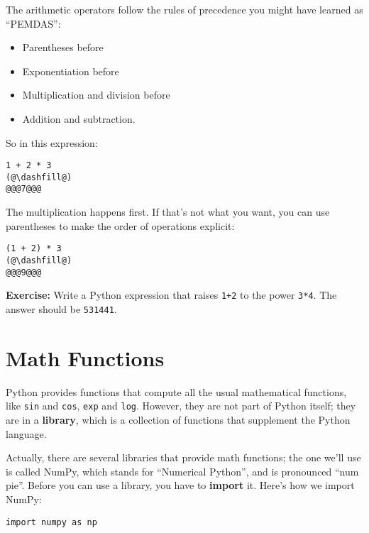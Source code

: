 The arithmetic operators follow the rules of precedence you might have
learned as ``PEMDAS'':

\begin{itemize}

\item
  Parentheses before
\item
  Exponentiation before
\item
  Multiplication and division before
\item
  Addition and subtraction.
\end{itemize}

So in this expression:

\begin{lstlisting}[]
1 + 2 * 3
(@\dashfill@)
@@@7@@@
\end{lstlisting}

The multiplication happens first. If that's not what you want, you can
use parentheses to make the order of operations explicit:

\begin{lstlisting}[]
(1 + 2) * 3
(@\dashfill@)
@@@9@@@
\end{lstlisting}

\textbf{Exercise:} Write a Python expression that raises
\passthrough{\lstinline!1+2!} to the power
\passthrough{\lstinline!3*4!}. The answer should be
\passthrough{\lstinline!531441!}.

\hypertarget{math-functions}{%
\section{Math Functions}\label{math-functions}}

Python provides functions that compute all the usual mathematical
functions, like \passthrough{\lstinline!sin!} and
\passthrough{\lstinline!cos!}, \passthrough{\lstinline!exp!} and
\passthrough{\lstinline!log!}. However, they are not part of Python
itself; they are in a \textbf{library}, which is a collection of
functions that supplement the Python language.

Actually, there are several libraries that provide math functions; the
one we'll use is called NumPy, which stands for ``Numerical Python'',
and is pronounced ``num pie''. Before you can use a library, you have to
\textbf{import} it. Here's how we import NumPy:

\begin{lstlisting}[]
import numpy as np
\end{lstlisting}


